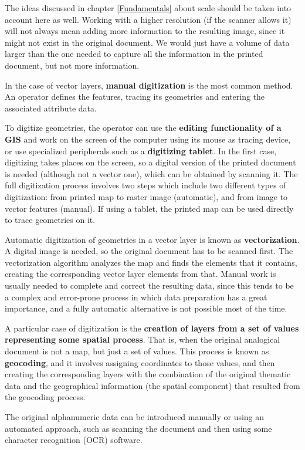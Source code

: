 The ideas discussed in chapter \ref{Fundamentals} about scale should be taken into account here as well. Working with a higher resolution (if the scanner allows it) will not always mean adding more information to the resulting image, since it might not exist in the original document. We would just have a volume of data larger than the one needed to capture all the information in the printed document, but not more information.

In the case of vector layers, \textbf{manual digitization} is the most common method. An operator defines the features, tracing its geometries and entering the associated attribute data.

To digitize geometries, the operator can use the \textbf{editing functionality of a GIS} and work on the screen of the computer using its mouse as tracing device, or use specialized peripherals such as a \textbf{digitizing tablet}. In the first case, digitizing takes places on the screen, so a digital version of the printed document is needed (although not a vector one), which can be obtained by scanning it. The full digitization process involves two steps which include two different types of digitization: from printed map to raster image (automatic), and from image to vector features (manual). If using a tablet, the printed map can be used directly to trace geometries on it.

Automatic digitization of geometries in a vector layer is known as \textbf{vectorization}. A digital image is needed, so the original document has to be scanned first. The vectorization algorithm analyzes the map and finds the elements that it contains, creating the corresponding vector layer elements from that. Manual work is usually needed to complete and correct the resulting data, since this tends to be a complex and error-prone process in which data preparation has a great importance, and a fully automatic alternative is not possible most of the time.

A particular case of digitization is the \textbf{creation of layers from a set of values representing some spatial process}. That is, when the original analogical document is not a map, but just a set of values. This process is known as \textbf{geocoding}, and it involves assigning coordinates to those values, and then creating the corresponding layers with the combination of the original thematic data and the geographical information (the spatial component) that resulted from the geocoding process.

The original alphanumeric data can be introduced manually or using an automated approach, such as scanning the document and then using some character recognition (OCR) software.

